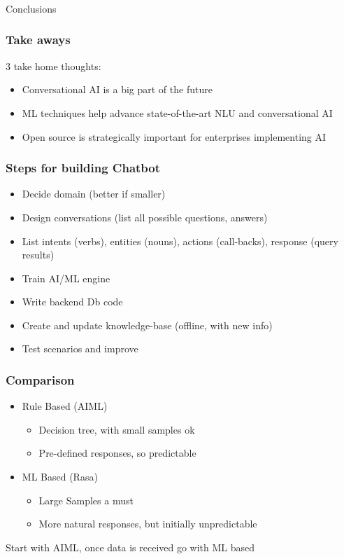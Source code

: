 \begin{frame}[fragile]\frametitle{}
\begin{center}
{\Large Conclusions}
\end{center}
\end{frame}

\begin{frame}\frametitle{Take aways}
3 take home thoughts:
\begin{itemize}
\item Conversational AI is a big part of the future
\item ML techniques help advance state-of-the-art NLU and conversational AI
\item  Open source is strategically important for enterprises 
implementing AI
\end{itemize}
\end{frame}

\begin{frame}\frametitle{Steps for building Chatbot }
\begin{itemize}
\item Decide domain (better if smaller)
\item Design conversations (list all possible questions, answers)
\item List intents (verbs), entities (nouns), actions (call-backs), response (query results)
\item Train AI/ML engine 
\item Write backend Db code
\item Create and update knowledge-base (offline, with new info)
\item Test scenarios and improve
\end{itemize}
\end{frame}

\begin{frame}\frametitle{Comparison}
\begin{itemize}
\item Rule Based (AIML)
\begin{itemize}
\item Decision tree, with small samples ok
\item Pre-defined responses, so predictable
\end{itemize}
\item ML Based (Rasa)
\begin{itemize}
\item Large Samples a must
\item More natural responses, but initially unpredictable
\end{itemize}
\end{itemize}

Start with AIML, once data is received go with ML based
\end{frame}

